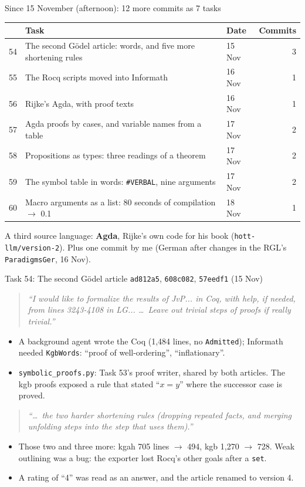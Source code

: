 \documentclass[10pt,aspectratio=169]{beamer}
\newcommand{\bad}[1]{\textcolor{warn}{#1}}
\newcommand{\ok}[1]{\textcolor{good}{#1}}
\newcommand{\commit}[1]{\texttt{\footnotesize #1}}
\newcommand{\prompt}[1]{\begin{quote}\small\itshape ``#1''\end{quote}}
\begin{document}
\begin{frame}{Since 15 November (afternoon): 12 more commits as 7 tasks}
  \footnotesize
  \begin{tabular}{rllr}
    \toprule
    & \textbf{Task} & \textbf{Date} & \textbf{Commits} \\
    \midrule
    54 & The second Gödel article: words, and five more shortening rules & 15 Nov & 3 \\
    55 & The Rocq scripts moved into Informath & 16 Nov & 1 \\
    \midrule
    56 & Rijke's Agda, with proof texts & 16 Nov & 1 \\
    57 & Agda proofs by cases, and variable names from a table & 17 Nov & 2 \\
    58 & Propositions as types: three readings of a theorem & 17 Nov & 2 \\
    59 & The symbol table in words: \texttt{\#VERBAL}, nine arguments & 17 Nov & 2 \\
    60 & Macro arguments as a list: 80 seconds of compilation $\to$ 0.1 & 18 Nov & 1 \\
    \bottomrule
  \end{tabular}

  \vspace{0.5em}
  A third source language: \textbf{Agda}, Rijke's own code for his book
  (\texttt{hott-llm/version-2}). Plus one commit by me (German after changes in the RGL's
  \texttt{ParadigmsGer}, 16 Nov).
\end{frame}

\begin{frame}{Task 54: The second Gödel article}
  \commit{ad812a5}, \commit{608c082}, \commit{57eedf1} (15 Nov)
  \prompt{I would like to formalize the results of JvP... in Coq, with help, if needed, from lines
  3243-4108 in LG... \ldots\ Leave out trivial steps of proofs if really trivial.}
  \begin{itemize}\small
    \item A background agent wrote the Coq (1,484 lines, no \texttt{Admitted}); Informath needed
          \texttt{KgbWords}: ``proof of well-ordering'', ``inflationary''.
    \item \texttt{symbolic\_proofs.py}: Task 53's proof writer, shared by both articles. The kgb
          proofs exposed a rule that stated \bad{``$x = y$''} where the successor case is proved.
  \end{itemize}
  \prompt{\ldots\ the two harder shortening rules (dropping repeated facts, and merging unfolding steps
  into the step that uses them).}
  \begin{itemize}\small
    \item Those two and three more: \ok{kgah 705 lines $\to$ 494, kgb 1,270 $\to$ 728}. Weak
          outlining was a bug: the exporter lost Rocq's other goals after a \texttt{set}.
    \item A rating of ``4'' was read as an answer, and the article renamed to version 4.
  \end{itemize}
\end{frame}
\end{document}
